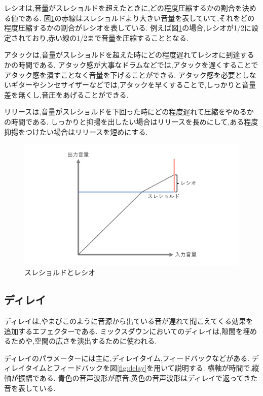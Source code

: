 \documentclass[12pt,a4j,titlepage]{ltjsarticle}
\begin{document}
レシオは,音量がスレショルドを超えたときに,どの程度圧縮するかの割合を決める値である.
図\ref{fig:comp1}の赤線はスレショルドより大きい音量を表していて,それをどの程度圧縮するかの割合がレシオを表している.
例えば図\ref{fig:comp1}の場合,レシオが1/2に設定されており,赤い線の1/2まで音量を圧縮することとなる.

アタックは,音量がスレショルドを超えた時にどの程度遅れてレシオに到達するかの時間である.
アタック感が大事なドラムなどでは,アタックを遅くすることでアタック感を潰すことなく音量を下げることができる.
アタック感を必要としないギターやシンセサイザーなどでは,アタックを早くすることで,しっかりと音量差を無くし,音圧をあげることができる.

リリースは,音量がスレショルドを下回った時にどの程度遅れて圧縮をやめるかの時間である.
しっかりと抑揚を出したい場合はリリースを長めにして,ある程度抑揚をつけたい場合はリリースを短めにする.

\begin{figure}[H]
\centering
 \includegraphics[width=150mm]{./figures/comp1.pdf}
 \caption{スレショルドとレシオ}
 \label{fig:comp1}
\end{figure}

\subsection{ディレイ}
ディレイは,やまびこのように音源から出ている音が遅れて聞こえてくる効果を追加するエフェクターである.
ミックスダウンにおいてのディレイは,隙間を埋めるためや,空間の広さを演出するために使われる.

ディレイのパラメーターには主に,ディレイタイム,フィードバックなどがある.
ディレイタイムとフィードバックを図\ref{fig:delay}を用いて説明する.
横軸が時間で,縦軸が振幅である.
青色の音声波形が原音,黄色の音声波形はディレイで返ってきた音を表している.
\end{document}
